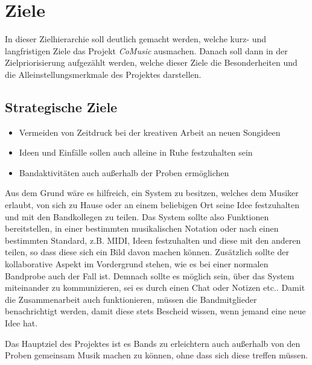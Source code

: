 \documentclass[12pt]{scrartcl}
\begin{document}

\section{Ziele}

In dieser Zielhierarchie soll deutlich gemacht werden, welche kurz- und langfristigen Ziele das Projekt \emph{CoMusic} ausmachen. Danach soll dann in der Zielpriorisierung aufgezählt werden, welche dieser Ziele die Besonderheiten und die Alleinstellungsmerkmale des Projektes darstellen.

\subsection{Strategische Ziele}

\begin{itemize}


\item Vermeiden von Zeitdruck bei der kreativen Arbeit an neuen Songideen
\item Ideen und Einfälle sollen auch alleine in Ruhe festzuhalten sein 
\item Bandaktivitäten auch außerhalb der Proben ermöglichen
\end{itemize}

Aus dem Grund wäre es hilfreich, ein System zu besitzen, welches dem Musiker erlaubt, von sich zu Hause oder an einem beliebigen Ort seine Idee festzuhalten und mit den Bandkollegen zu teilen. Das System sollte also Funktionen bereitstellen, in einer bestimmten musikalischen Notation oder nach einen bestimmten Standard, z.B. MIDI, Ideen festzuhalten und diese mit den anderen teilen, so dass diese sich ein Bild davon machen können. Zusätzlich sollte der kollaborative Aspekt im Vordergrund stehen, wie es bei einer normalen Bandprobe auch der Fall ist. Demnach sollte es möglich sein, über das System miteinander zu kommunizieren, sei es durch einen Chat oder Notizen etc.. Damit die Zusammenarbeit auch funktionieren, müssen die Bandmitglieder benachrichtigt werden, damit diese stets Bescheid wissen, wenn jemand eine neue Idee hat.

Das Hauptziel des Projektes ist es Bands zu erleichtern auch außerhalb von den Proben gemeinsam Musik machen zu können, ohne dass sich diese treffen müssen.
\end{document}
